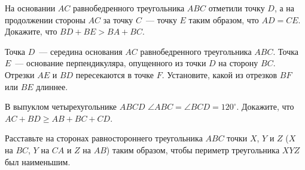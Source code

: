 \begin{problems}
\item На основании $AC$ равнобедренного треугольника $ABC$ отметили точку $D$, а на продолжении стороны $AC$ за точку $C$~--- точку $E$ таким образом, что $AD=CE$. Докажите, что $BD+BE>BA+BC$.

\item Точка $D$~--- середина основания $AC$ равнобедренного треугольника
$ABC$. Точка $E$~--- основание перпендикуляра, опущенного из точки $D$ на
сторону $BC$. Отрезки $AE$ и $BD$ пересекаются в точке $F$. Установите,
какой из отрезков $BF$ или $BE$ длиннее.

\item В выпуклом четырехугольнике $ABCD$ $\angle ABC= \angle BCD=120^{\circ}$. Докажите, что $AC+BD \geq AB+BC+CD $.

\item Расставьте на сторонах равностороннего треугольника $ABC$ точки $X$, $Y$ и $Z$ ($X$ на $BC$, $Y$ на $CA$ и $Z$ на $AB$) таким образом, чтобы периметр треугольника $XYZ$ был наименьшим.

\end{problems}